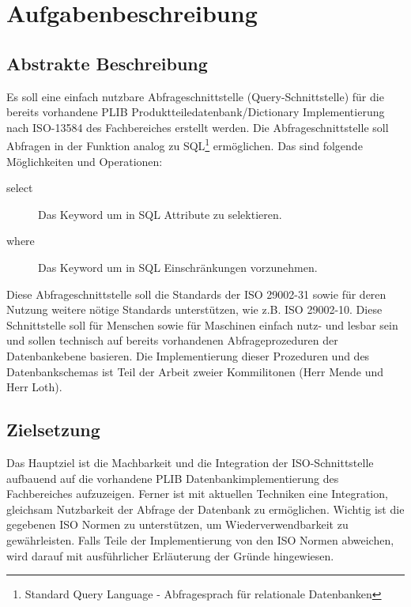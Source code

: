 \chapter{Aufgabenbeschreibung} \label{Aufgabenbeschreibung}

\section{Abstrakte Beschreibung}

Es soll eine einfach nutzbare Abfrageschnittstelle (Query-Schnittstelle) für die bereits vorhandene PLIB Produktteiledatenbank/Dictionary Implementierung nach ISO-13584 des Fachbereiches erstellt werden. Die Abfrageschnittstelle soll Abfragen in der Funktion analog zu SQL\footnote{Standard Query Language - Abfragesprach für relationale Datenbanken} ermöglichen. 
Das sind folgende Möglichkeiten und Operationen:
\begin{description}
\item[select] Das Keyword um in SQL Attribute zu selektieren.  
\item[where] Das Keyword um in SQL Einschränkungen vorzunehmen. 
\end{description}
 
Diese Abfrageschnittstelle soll die Standards der ISO 29002-31 sowie für deren Nutzung weitere nötige Standards unterstützen, wie z.B. ISO 29002-10. Diese Schnittstelle soll für Menschen sowie für Maschinen einfach nutz- und lesbar sein und sollen technisch auf bereits vorhandenen Abfrageprozeduren der Datenbankebene basieren. Die Implementierung dieser Prozeduren und des Datenbankschemas ist Teil der Arbeit zweier Kommilitonen (Herr Mende und Herr Loth).

\section{Zielsetzung}

Das Hauptziel ist die Machbarkeit und die Integration der ISO-Schnittstelle aufbauend auf die vorhandene PLIB Datenbankimplementierung des Fachbereiches aufzuzeigen. 
Ferner ist mit aktuellen Techniken eine Integration, gleichsam Nutzbarkeit der Abfrage der Datenbank zu ermöglichen. Wichtig ist die gegebenen ISO Normen zu unterstützen, um Wiederverwendbarkeit zu gewährleisten. Falls Teile der Implementierung von den ISO Normen abweichen, wird darauf mit ausführlicher Erläuterung der Gründe hingewiesen. 

